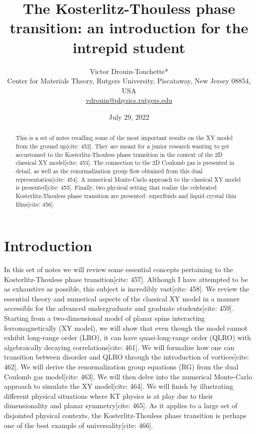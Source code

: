 \documentclass[11pt]{article}
\title{The Kosterlitz-Thouless phase transition: an introduction for the intrepid student}
\author{Victor Drouin-Touchette* \\
        Center for Materials Theory, Rutgers University, Piscataway, New Jersey 08854, USA \\
        \href{mailto:vdrouin@physics.rutgers.edu}{vdrouin@physics.rutgers.edu}}
\date{July 29, 2022}
\begin{document}
\maketitle

\begin{abstract}
This is a set of notes recalling some of the most important results on the XY model from the ground up[cite: 452]. They are meant for a junior research wanting to get accustomed to the Kosterlitz-Thouless phase transition in the context of the 2D classical XY model[cite: 453]. The connection to the 2D Coulomb gas is presented in detail, as well as the renormalization group flow obtained from this dual representation[cite: 454]. A numerical Monte-Carlo approach to the classical XY model is presented[cite: 455]. Finally, two physical setting that realize the celebrated Kosterlitz-Thouless phase transition are presented: superfluids and liquid crystal thin films[cite: 456].
\end{abstract}

\tableofcontents
\clearpage

\section{Introduction}

In this set of notes we will review some essential concepts pertaining to the Kosterlitz-Thouless phase transition[cite: 457]. Although I have attempted to be as exhaustive as possible, this subject is incredibly vast[cite: 458]. We review the essential theory and numerical aspects of the classical XY model in a manner accessible for the advanced undergraduate and graduate students[cite: 459]. Starting from a two-dimensional model of planar spins interacting ferromagnetically (XY model), we will show that even though the model cannot exhibit long-range order (LRO), it can have quasi-long-range order (QLRO) with algebraically decaying correlations[cite: 461]. We will formalize how one can transition between disorder and QLRO through the introduction of vortices[cite: 462]. We will derive the renormalization group equations (RG) from the dual Coulomb gas model[cite: 463]. We will then delve into the numerical Monte-Carlo approach to simulate the XY model[cite: 464]. We will finish by illustrating different physical situations where KT physics is at play due to their dimensionality and planar symmetry[cite: 465]. As it applies to a large set of disjointed physical contexts, the Kosterlitz-Thouless phase transition is perhaps one of the best example of universality[cite: 466].
\end{document}
